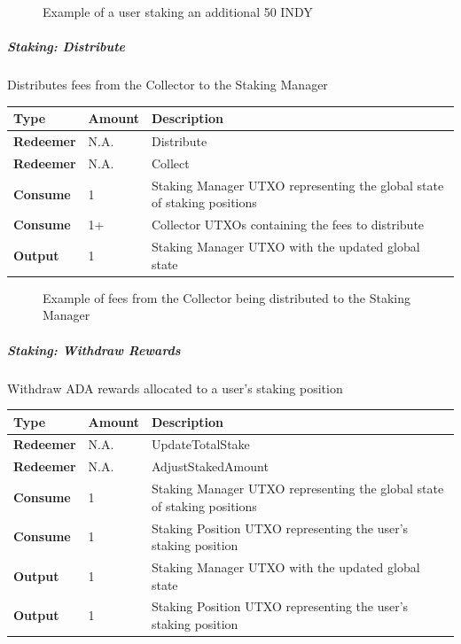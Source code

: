 \documentclass{article}
\begin{document}
\begin{sloppypar}
\hypertarget{staking-stake-figure}{%
\begin{figure}[htbp]
\centering

\caption{Example of a user staking an additional 50 INDY}
\label{staking-stake-figure}
\end{figure}}

\hypertarget{staking-distribute}{%
\subparagraph{Staking: Distribute}\label{staking-distribute}}

Distributes fees from the Collector to the Staking Manager

\begin{tabularx}{\linewidth}{l|l|L}
\toprule
\textbf{Type} & \textbf{Amount} & \textbf{Description}
\tabularnewline
\midrule
\endhead
\textbf{Redeemer} & N.A. & Distribute
\tabularnewline
\midrule
\textbf{Redeemer} & N.A. & Collect
\tabularnewline
\midrule
\textbf{Consume} & 1 & Staking Manager UTXO representing the global
state of staking positions
\tabularnewline
\midrule
\textbf{Consume} & 1+ & Collector UTXOs containing the fees to
distribute
\tabularnewline
\midrule
\textbf{Output} & 1 & Staking Manager UTXO with the updated global
state
\tabularnewline
\bottomrule
\end{tabularx}

\hypertarget{staking-distribute-figure}{%
\begin{figure}[htbp]
\centering

\caption{Example of fees from the Collector being distributed to
the Staking Manager}
\label{staking-distribute-figure}
\end{figure}}

\hypertarget{staking-withdraw-rewards}{%
\subparagraph{Staking: Withdraw
Rewards}\label{staking-withdraw-rewards}}

Withdraw ADA rewards allocated to a user's staking position

\begin{tabularx}{\linewidth}{l|l|L}
\toprule
\textbf{Type} & \textbf{Amount} & \textbf{Description}
\tabularnewline
\midrule
\endhead
\textbf{Redeemer} & N.A. & UpdateTotalStake
\tabularnewline
\midrule
\textbf{Redeemer} & N.A. & AdjustStakedAmount
\tabularnewline
\midrule
\textbf{Consume} & 1 & Staking Manager UTXO representing the global
state of staking positions
\tabularnewline
\midrule
\textbf{Consume} & 1 & Staking Position UTXO representing the user's
staking position
\tabularnewline
\midrule
\textbf{Output} & 1 & Staking Manager UTXO with the updated global
state
\tabularnewline
\midrule
\textbf{Output} & 1 & Staking Position UTXO representing the user's
staking position
\tabularnewline
\bottomrule
\end{tabularx}


\end{sloppypar}
\end{document}
